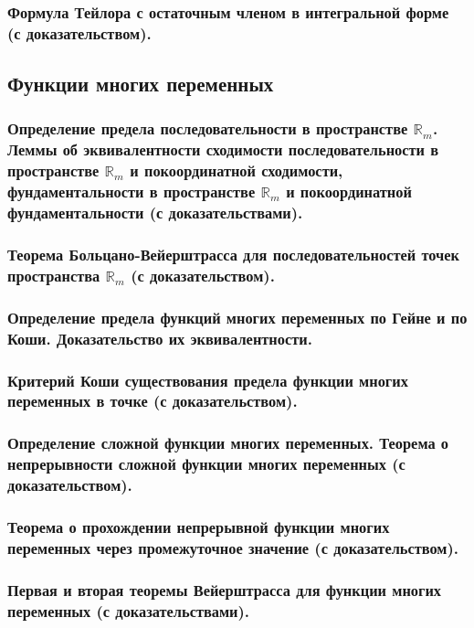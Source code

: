 \documentclass[10pt]{article}
\begin{document}
    \subsubsection{Формула Тейлора с остаточным членом в интегральной форме (с доказательством).}
    \subsection{Функции многих переменных}
    \subsubsection{Определение предела последовательности в пространстве $\mathbb{R}_m$. Леммы об эквивалентности сходимости последовательности в пространстве $\mathbb{R}_m$ и покоординатной сходимости, фундаментальности в пространстве $\mathbb{R}_m$ и покоординатной фундаментальности (с доказательствами).}
    \subsubsection{Теорема Больцано-Вейерштрасса для последовательностей точек пространства $\mathbb{R}_m$ (с доказательством).}
    \subsubsection{Определение предела функций многих переменных по Гейне и по Коши. Доказательство их эквивалентности.}
    \subsubsection{Критерий Коши существования предела функции многих переменных в точке (с доказательством).}
    \subsubsection{Определение сложной функции многих переменных. Теорема о непрерывности сложной функции многих переменных (с доказательством).}
    \subsubsection{Теорема о прохождении непрерывной функции многих переменных через промежуточное значение (с доказательством).}
    \subsubsection{Первая и вторая теоремы Вейерштрасса для функции многих переменных (с доказательствами).}
\end{document}
